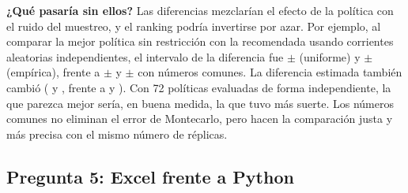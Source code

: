 \textbf{¿Qué pasaría sin ellos?} Las diferencias mezclarían el efecto de la política con el
ruido del muestreo, y el ranking podría invertirse por azar. Por ejemplo, al comparar la mejor
política sin restricción con la recomendada usando corrientes aleatorias independientes, el
intervalo de la diferencia fue $\pm$\pyUDifIndIC{} (uniforme) y $\pm$\pyEDifIndIC{}
(empírica), frente a $\pm$\pyUDifParIC{} y $\pm$\pyEDifParIC{} con números comunes. La
diferencia estimada también cambió (\pyUDifInd{} y \pyEDifInd{}, frente a \pyUDifPar{} y
\pyEDifPar{}). Con 72 políticas evaluadas de forma independiente, la que parezca mejor sería, en
buena medida, la que tuvo más suerte. Los números comunes no eliminan el error de Montecarlo,
pero hacen la comparación justa y más precisa con el mismo número de réplicas.

\subsection{Pregunta 5: Excel frente a Python}

